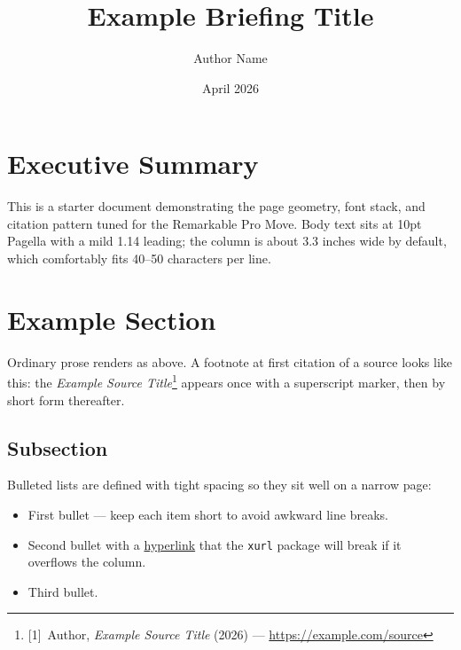 


\newcommand{\briefingtitle}{Example Briefing}
\newcommand{\transcriptnum}{01}

\title{Example Briefing Title}
\author{Author Name}
\date{April 2026}


\maketitle
\thispagestyle{plain}

\section*{Executive Summary}

This is a starter document demonstrating the page geometry, font stack, and
citation pattern tuned for the Remarkable Pro Move. Body text sits at 10pt
Pagella with a mild 1.14 leading; the column is about 3.3 inches wide by
default, which comfortably fits 40--50 characters per line.

\section*{Example Section}

Ordinary prose renders as above. A footnote at first citation of a source
looks like this: the \textit{Example Source Title}\footnote{[1]~Author, %
\textit{Example Source Title} (2026) — \url{https://example.com/source}}
appears once with a superscript marker, then by short form thereafter.

\subsection*{Subsection}

Bulleted lists are defined with tight spacing so they sit well on a narrow
page:

\begin{itemize}
  \item First bullet — keep each item short to avoid awkward line breaks.
  \item Second bullet with a \href{https://example.com}{hyperlink} that the
        \texttt{xurl} package will break if it overflows the column.
  \item Third bullet.
\end{itemize}

